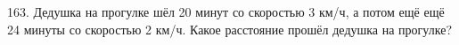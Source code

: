 163. Дедушка на прогулке шёл 20 минут со скоростью 3 км/ч, а потом ещё ещё 24 минуты со скоростью 2 км/ч. Какое расстояние прошёл дедушка на прогулке?\\
